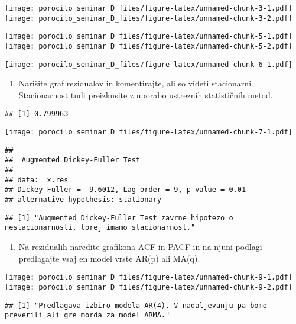 \documentclass[
]{article}
\providecommand{\tightlist}{%
  \setlength{\itemsep}{0pt}\setlength{\parskip}{0pt}}
\begin{document}
\texttt{[image: porocilo\_seminar\_D\_files/figure-latex/unnamed-chunk-3-1.pdf]}
\texttt{[image: porocilo\_seminar\_D\_files/figure-latex/unnamed-chunk-3-2.pdf]}

\texttt{[image: porocilo\_seminar\_D\_files/figure-latex/unnamed-chunk-5-1.pdf]}
\texttt{[image: porocilo\_seminar\_D\_files/figure-latex/unnamed-chunk-5-2.pdf]}

\texttt{[image: porocilo\_seminar\_D\_files/figure-latex/unnamed-chunk-6-1.pdf]}

\begin{enumerate}
\def\labelenumi{\arabic{enumi}.}
\setcounter{enumi}{2}
\tightlist
\item
  Narišite graf rezidualov in komentirajte, ali so videti stacionarni.
  Stacionarnost tudi preizkusite z uporabo ustreznih statističnih metod.
\end{enumerate}

\begin{verbatim}
## [1] 0.799963
\end{verbatim}

\texttt{[image: porocilo\_seminar\_D\_files/figure-latex/unnamed-chunk-7-1.pdf]}

\begin{verbatim}
## 
##  Augmented Dickey-Fuller Test
## 
## data:  x.res
## Dickey-Fuller = -9.6012, Lag order = 9, p-value = 0.01
## alternative hypothesis: stationary
\end{verbatim}

\begin{verbatim}
## [1] "Augmented Dickey-Fuller Test zavrne hipotezo o nestacionarnosti, torej imamo stacionarnost."
\end{verbatim}

\begin{enumerate}
\def\labelenumi{\arabic{enumi}.}
\setcounter{enumi}{3}
\tightlist
\item
  Na rezidualih naredite grafikona ACF in PACF in na njuni podlagi
  predlagajte vsaj en model vrste AR(p) ali MA(q).
\end{enumerate}

\texttt{[image: porocilo\_seminar\_D\_files/figure-latex/unnamed-chunk-9-1.pdf]}
\texttt{[image: porocilo\_seminar\_D\_files/figure-latex/unnamed-chunk-9-2.pdf]}

\begin{verbatim}
## [1] "Predlagava izbiro modela AR(4). V nadaljevanju pa bomo preverili ali gre morda za model ARMA."
\end{verbatim}
\end{document}
